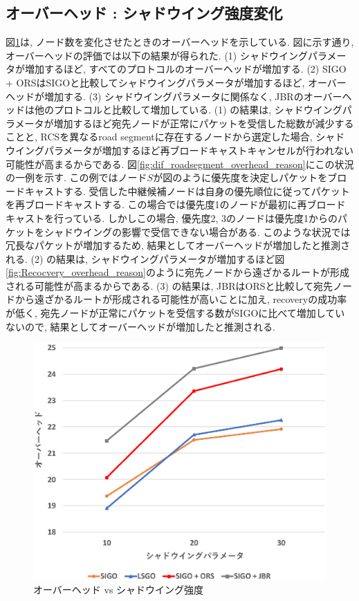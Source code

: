 \documentclass[10pt]{jreport}
\begin{document}
\subsection{オーバーヘッド : シャドウイング強度変化}
図\ref{fig:SIGO_overhead_shadow}は, ノード数を変化させたときのオーバーヘッドを示している.
図に示す通り, オーバーヘッドの評価では以下の結果が得られた.
(1) シャドウイングパラメータが増加するほど, すべてのプロトコルのオーバーヘッドが増加する.
(2) SIGO + ORSはSIGOと比較してシャドウイングパラメータが増加するほど, オーバーヘッドが増加する.
(3) シャドウイングパラメータに関係なく, JBRのオーバーヘッドは他のプロトコルと比較して増加している.
(1) の結果は, シャドウイングパラメータが増加するほど宛先ノードが正常にパケットを受信した総数が減少することと, RCSを異なるroad segmentに存在するノードから選定した場合, シャドウイングパラメータが増加するほど再ブロードキャストキャンセルが行われない可能性が高まるからである. 図\ref{fig:dif_roadsegment_overhead_reason}にこの状況の一例を示す.
この例ではノード$S$が図のように優先度を決定しパケットをブロードキャストする. 受信した中継候補ノードは自身の優先順位に従ってパケットを再ブロードキャストする. この場合では優先度1のノードが最初に再ブロードキャストを行っている. しかしこの場合, 優先度2, 3のノードは優先度1からのパケットをシャドウイングの影響で受信できない場合がある. このような状況では冗長なパケットが増加するため, 結果としてオーバーヘッドが増加したと推測される.
(2) の結果は, シャドウイングパラメータが増加するほど図\ref{fig:Recocvery_overhead_reason}のように宛先ノードから遠ざかるルートが形成される可能性が高まるからである. 
(3) の結果は, JBRはORSと比較して宛先ノードから遠ざかるルートが形成される可能性が高いことに加え, recoveryの成功率が低く, 宛先ノードが正常にパケットを受信する数がSIGOに比べて増加していないので, 結果としてオーバーヘッドが増加したと推測される.


\begin{figure}[!ht]
	\centering
	\includegraphics[width=120mm]{figures/SIGO_overhead_shadow.eps}
	\caption{オーバーヘッド vs シャドウイング強度}
	\label{fig:SIGO_overhead_shadow}
\end{figure}
\end{document}
